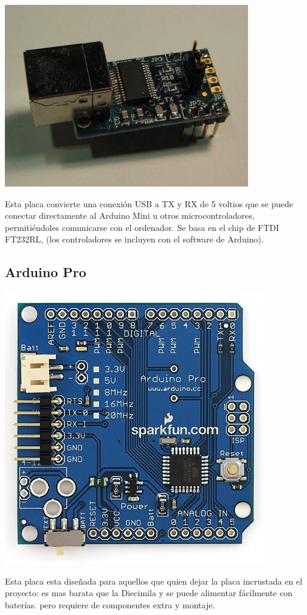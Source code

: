 \documentclass[12pt,a4paper]{report}
\begin{document}
\includegraphics[scale=0.6]{mini_usb.jpg}

Esta placa convierte una conexión USB a TX y RX de 5 voltios que se puede conectar directamente al Arduino Mini u otros microcontroladores, permitiéndoles comunicarse con el ordenador. Se basa en el chip de FTDI FT232RL, (los controladores se incluyen con el software de Arduino).

\subsection{Arduino Pro}

\includegraphics[scale=0.6]{ArduinoPro.jpg}

Esta placa esta diseñada para aquellos que quien dejar la placa incrustada en el proyecto: es mas barata que la Diecimila y se puede alimentar fácilmente con baterías. pero requiere de componentes extra y montaje. 
\end{document}
